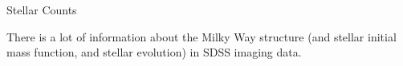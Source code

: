 \documentclass[letterpaper,landscape]{slides}
\begin{document}




\begin{slide}
\begin{center}
{\large \color{red} 
                    Stellar Counts
}
\end{center}

{\color{blue} 
There is a lot of information about the Milky Way structure (and stellar
initial mass function, and stellar evolution) in SDSS imaging data.
}

\vfill
\end{slide}



\begin{slide}
     \begin{center}
        \begin{minipage}{7in}
            \phantom{x} \vskip -2.0in
            \phantom{x} \hskip -0.5in
            {}
        \end{minipage}
     \end{center}
     \vfill
\end{slide}




\end{document}
